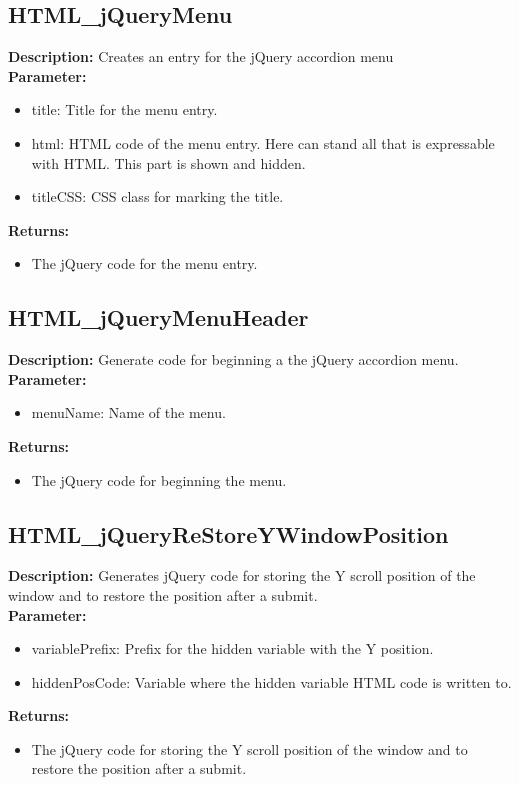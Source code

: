 \subsection{HTML\_jQueryMenu}
\textbf{Description:} Creates an entry for the jQuery accordion menu\\
\textbf{Parameter:}
\begin{itemize}
\item title: Title for the menu entry.
\item html: HTML code of the menu entry. Here can stand all that is expressable with HTML. This part is shown and hidden.
\item titleCSS: CSS class for marking the title.
\end{itemize}
\textbf{Returns:}
\begin{itemize}
\item The jQuery code for the menu entry.
\end{itemize}

\subsection{HTML\_jQueryMenuHeader}
\textbf{Description:} Generate code for beginning a the jQuery accordion menu.\\
\textbf{Parameter:}
\begin{itemize}
\item menuName: Name of the menu.
\end{itemize}
\textbf{Returns:}
\begin{itemize}
\item The jQuery code for beginning the menu.
\end{itemize}

\subsection{HTML\_jQueryReStoreYWindowPosition}
\textbf{Description:} Generates jQuery code for storing the Y scroll position of the window and to restore the position after a submit.\\
\textbf{Parameter:}
\begin{itemize}
\item variablePrefix: Prefix for the hidden variable with the Y position.
\item hiddenPosCode: Variable where the hidden variable HTML code is written to.
\end{itemize}
\textbf{Returns:}
\begin{itemize}
\item The jQuery code for storing the Y scroll position of the window and to restore the position after a submit.
\end{itemize}

